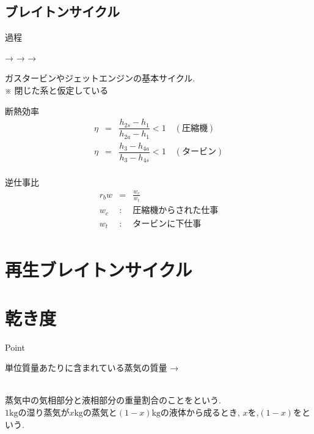 \documentclass[a4paper]{jsarticle}
\begin{document}
\subsection{ブレイトンサイクル}
\begin{itembox}[l]{過程}
    \begin{center}
        \quad → \quad {} \quad → \quad {} \quad → \quad {}
    \end{center}
\end{itembox}
ガスタービンやジェットエンジンの基本サイクル.\\
※ 閉じた系と仮定している
\begin{itembox}[l]{断熱効率}
    \begin{eqnarray*}
        \eta &=& \dfrac{h_{2s}-h_1}{h_{2a}-h_1} <1 \quad (圧縮機)\\
        \eta &=& \dfrac{h_3-h_{4a}}{h_3-h_{4s}} <1 \quad (タービン)\\
    \end{eqnarray*}
\end{itembox}
\begin{itembox}[l]{逆仕事比}
    \begin{eqnarray*}
        r_bw &=& \frac{w_c}{w_t}\\
        w_c&:&圧縮機からされた仕事\\
        w_t&:&タービンに下仕事\\
    \end{eqnarray*}
\end{itembox}
\section{再生ブレイトンサイクル}
\section{乾き度}
\begin{itembox}[l]{Point}
    \begin{center}
        単位質量あたりに含まれている蒸気の質量 → 
    \end{center}
\end{itembox}
\\
蒸気中の気相部分と液相部分の重量割合のことをという.\\
$1\mathrm{kg}$の湿り蒸気が$x\mathrm{kg}$の蒸気と$\left(1-x\right)\mathrm{kg}$の液体から成るとき,
$x$を,$\left(1-x\right)$をという.
\end{document}
